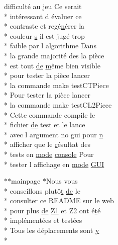 \begin{DoxyCompactItemize}
difficulté au jeu Ce serait \\*
intéressant d évaluer ce \\*
contraste et regé\hyperlink{glext_8h_a0788d3762d0c3c76e4c094d8078b4c27}{n}érer la \\*
couleur \hyperlink{gl_8h_ad585a1393cfa368fa9dc3d8ebff640d5}{s} il est jugé trop \\*
faible par l algorithme Dans \\*
la grande majorité des la pièce \\*
est tout \hyperlink{mainpage_8dox_ab37fa35e77d95c6d0d0ab620c97c3db8}{de} \hyperlink{glext_8h_af593500c283bf1a787a6f947f503a5c2}{m}ême bien visible \\*
pour tester la pièce lancer \\*
la commande make test\-C\-T\-Piece \\*
Pour tester la pièce lancer \\*
la commande make test\-C\-L2\-Piece \\*
Cette commande compile le \\*
fichier \hyperlink{mainpage_8dox_ab37fa35e77d95c6d0d0ab620c97c3db8}{de} test et le lance \\*
avec l argument no gui pour \hyperlink{glext_8h_a0788d3762d0c3c76e4c094d8078b4c27}{n} \\*
afficher que le \hyperlink{gl_8h_abe08814c2f72843fde4d8df41440d5a0}{r}ésultat des \\*
tests en \hyperlink{glext_8h_a1e71d9c196e4683cc06c4b54d53f7ef5}{mode} \hyperlink{mainpage_8dox_a4aa4ee6520a20be6bee3a5219b5d8d9b}{console} Pour \\*
tester l affichage en \hyperlink{glext_8h_a1e71d9c196e4683cc06c4b54d53f7ef5}{mode} \hyperlink{mainpage_8dox_ae5213d53c1da87c36d69f8d2acaca332}{G\-U\-I}
\item 
$\ast$$\ast$mainpage $\ast$Nous vous \\*
conseillons plutô\hyperlink{gl_8h_a00140d6f5c548b26daf170bf16e86a6d}{t} \hyperlink{mainpage_8dox_ab37fa35e77d95c6d0d0ab620c97c3db8}{de} le \\*
consulter ce R\-E\-A\-D\-M\-E sur le web \\*
pour plus \hyperlink{mainpage_8dox_ab37fa35e77d95c6d0d0ab620c97c3db8}{de} \hyperlink{mainpage_8dox_ac1b4262bdb6c0693bc375775d6cfa421}{Z1} et Z2 ont é\hyperlink{gl_8h_a00140d6f5c548b26daf170bf16e86a6d}{t}é \\*
implémentées et testées \\*
Tous les déplacements sont \hyperlink{gl_8h_a74d80fd479c0f6d0153c709949a089ef}{y} \\*
$$
\end{DoxyCompactItemize}

